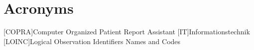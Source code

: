 \chapter*{Acronyms}
    \begin{acronym}[loinccopra]
    	
    	[COPRA]{Computer Organized Patient Report Assistant}
    	[IT]{Informationstechnik}
    	[LOINC]{Logical Observation Identifiers Names and Codes}
    	
    \end{acronym}